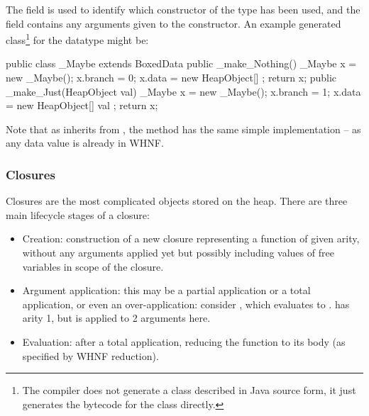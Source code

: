\documentclass[dissertation.tex]{subfiles}
\begin{document}
{{{            The  field is used to identify which constructor of the type has been used, and the  field contains any arguments given to the constructor. An example generated class\footnote{The compiler does not generate a class described in Java source form, it just generates the bytecode for the class directly.} for the datatype  might be:

            \begin{javafigure}
            public class _Maybe extends BoxedData {
                public _make_Nothing() {
                    _Maybe x = new _Maybe();
                    x.branch = 0;
                    x.data = new HeapObject[] {};
                    return x;
                }
                public _make_Just(HeapObject val) {
                    _Maybe x = new _Maybe();
                    x.branch = 1;
                    x.data = new HeapObject[] { val };
                    return x;
                }
            }
            \end{javafigure}

            Note that as  inherits from , the  method has the same simple implementation -- as any data value is already in WHNF.
        }
        \subsubsection{Closures}\label{sec:closures}
        {
            Closures are the most complicated objects stored on the heap. There are three main lifecycle stages of a closure:

            \begin{itemize}
            \item
            {
                Creation: construction of a new closure representing a function of given arity, without any arguments applied yet but possibly including values of free variables in scope of the closure.
            }
            \item
            {
                Argument application: this may be a partial application or a total application, or even an over-application: consider , which evaluates to .  has arity 1, but is applied to 2 arguments here.
            }
            \item
            {
                Evaluation: after a total application, reducing the function to its body (as specified by WHNF reduction).
            }
            \end{itemize}

}}}
\end{document}
